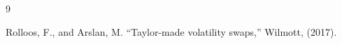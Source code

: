 \documentclass[11pt]{article}
\begin{document}
\begin{thebibliography}{9}











 Rolloos, F., and Arslan, M. ``Taylor-made volatility swaps,'' Wilmott, (2017).



\end{thebibliography}
\end{document}
